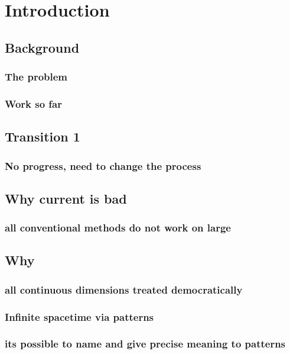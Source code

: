 \documentclass{article}
\begin{document}
\section{Introduction}
		\subsection{Background}
			\subsubsection{The problem}
			\subsubsection{Work so far}
		\subsection{Transition 1}
			\subsubsection{No progress, need to change the process}
		\subsection{Why current is bad}
		    \subsubsection{all conventional methods do not work on large}
	    \subsection{Why}
		    \subsubsection{all continuous dimensions treated democratically}
			\subsubsection{Infinite spacetime via patterns}
			\subsubsection{its possible to name and give precise meaning to patterns}
\end{document}
